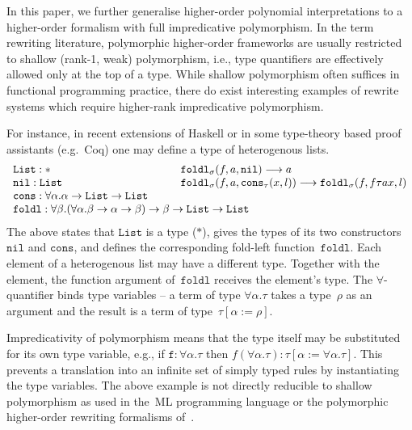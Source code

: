 \documentclass[a4paper,UKenglish,cleveref,autoref,numberwithinsect]{lipics-v2019}
\theoremstyle{definition}
\newcommand{\arrtype}{\rightarrow}
\newcommand{\subst}[2]{#1:=#2}
\newcommand{\red}{\longrightarrow}
\newcommand{\List}{\mathtt{List}}
\newcommand{\nil}{\mathtt{nil}}
\newcommand{\cons}{\mathtt{cons}}
\begin{document}
In this paper, we further generalise higher-order polynomial
interpretations to a higher-order formalism with full impredicative
polymorphism. In the term rewriting literature, polymorphic
higher-order frameworks are usually restricted to shallow (rank-1,
weak) polymorphism, i.e., type quantifiers are effectively allowed
only at the top of a type. While shallow polymorphism often suffices
in functional programming practice, there do exist interesting
examples of rewrite systems which require higher-rank impredicative
polymorphism.

For instance, in recent extensions of Haskell or in some type-theory
based proof assistants (e.g.~Coq) one may define a type of
heterogenous lists.
\[
\begin{array}{ll}
  \List : * &
  \mathtt{foldl}_\sigma(f,a,\nil) \red a \\
  \mathtt{nil} : \List &
  \mathtt{foldl}_\sigma(f,a,\cons_\tau(x,l)) \red \mathtt{foldl}_\sigma(f,f \tau a x,l) \\
  \mathtt{cons} : \forall \alpha . \alpha \arrtype \List \arrtype \List \quad\quad \\
  \multicolumn{2}{l}{\mathtt{foldl} : \forall \beta . (\forall \alpha . \beta \arrtype \alpha \arrtype \beta) \arrtype \beta \arrtype \List \arrtype \List}
\end{array}
\]
The above states that $\List$ is a type ($*$), gives the types of its
two constructors $\nil$ and $\cons$, and defines the corresponding
fold-left function~$\mathtt{foldl}$. Each element of a heterogenous
list may have a different type. Together with the element, the
function argument of~$\mathtt{foldl}$ receives the element's type. The
$\forall$-quantifier binds type variables -- a term of type $\forall
\alpha . \tau$ takes a type~$\rho$ as an argument and the result is a
term of type~$\tau[\subst{\alpha}{\rho}]$.

Impredicativity of polymorphism means that the type itself may be
substituted for its own type variable, e.g., if $\mathtt{f} : \forall
\alpha . \tau$ then $f (\forall \alpha . \tau) :
\tau[\subst{\alpha}{\forall\alpha.\tau}]$. This prevents a translation
into an infinite set of simply typed rules by instantiating the type
variables. The above example is not directly reducible to shallow
polymorphism as used in the~ML programming language or the polymorphic
higher-order rewriting formalisms of~\cite{jou:oka:91,jou:rub:99}.
\end{document}
